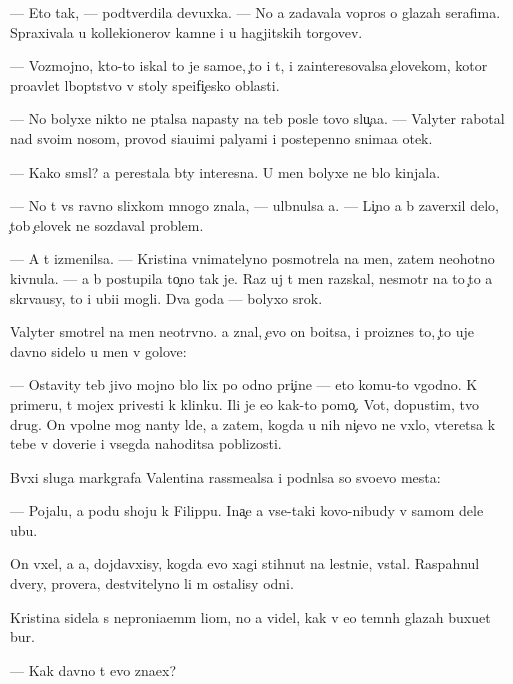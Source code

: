 \documentclass[10pt]{book}
\begin{document}
— Eto tak, — podtverdila devuxka. — No {\y}a zadavala vopros{\yi} o glazah serafima. Spraxivala u kollek{\q}ionerov kamne{\y} i u hagjitskih torgov{\q}ev.

— Vozmojno, kto-to iskal to je samo{\y}e, {\c}to i t{\yi}, i za{\y}interesovalsa {\c}elovekom, kotor{\yi}{\y} pro{\y}avl{\ia}{\y}et l{\iu}bop{\yi}tstvo v stoly spe{\q}ifi{\c}esko{\y} oblasti.

— No bolyxe nikto ne p{\yi}talsa napasty na teb{\ia} posle tovo slu{\c}a{\y}a. — Valyter rabotal nad svo{\y}im nosom, provod{\ia} si{\y}a{\y}u{\x}imi paly{\q}ami i postepenno snima{\y}a otek.

— Kako{\y} sm{\yi}sl? {\Y}a perestala b{\yi}ty interesna. U men{\ia} bolyxe ne b{\yi}lo kinjala.

— No t{\yi} vs{\e} ravno slixkom mnogo znala, — ul{\yi}bnulsa {\y}a. — Li{\c}no {\y}a b{\yi} zaverxil delo, {\c}tob{\yi} {\c}elovek ne sozdaval problem{\yi}.

— A t{\yi} izmenilsa. — Kristina vnimatelyno posmotrela na men{\ia}, zatem neohotno kivnula. — {\Y}a b{\yi} postupila to{\c}no tak je. Raz uj t{\yi} men{\ia} raz{\yi}skal, nesmotr{\ia} na to {\c}to {\y}a skr{\yi}va{\y}usy, to i ubi{\y}{\q}i mogli. Dva goda — bolyxo{\y} srok.

Valyter smotrel na men{\ia} neotr{\yi}vno. {\Y}a znal, {\c}evo on bo{\y}itsa, i pro{\y}iznes to, {\c}to uje davno sidelo u men{\ia} v golove:

— Ostavity teb{\ia} jivo{\y} mojno b{\yi}lo lix po odno{\y} pri{\c}ine — eto komu-to v{\yi}godno. K primeru, t{\yi} mojex privesti k klinku. Ili je {\y}e{\x}o kak-to pomo{\c}. Vot, dopustim, tvo{\y} drug. On vpolne mog nan{\ia}ty l{\iu}de{\y}, a zatem, kogda u nih ni{\c}evo ne v{\yi}xlo, vteretsa k tebe v doveri{\y}e i vsegda nahoditsa poblizosti.

B{\yi}vxi{\y} sluga markgrafa Valentina rassme{\y}alsa i podn{\ia}lsa so svo{\y}evo mesta:

— Pojalu{\y}, {\y}a po{\y}du shoju k Filippu. Ina{\c}e {\y}a vse-taki kovo-nibudy v samom dele ub{\y}u.

On v{\yi}xel, a {\y}a, dojdavxisy, kogda {\y}evo xagi stihnut na lestni{\q}e, vstal. Raspahnul dvery, prover{\ia}{\y}a, de{\y}stvitelyno li m{\yi} ostalisy odni.

Kristina sidela s neproni{\q}a{\y}em{\yi}m li{\q}om, no {\y}a videl, kak v {\y}e{\y}o temn{\yi}h glazah buxu{\y}et bur{\ia}.

— Kak davno t{\yi} {\y}evo zna{\y}ex?
\end{document}
